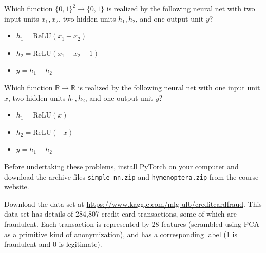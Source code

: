 \documentclass{article}
\newcommand{\R}{\mathbb{R}}
\begin{document}
\begin{probset}
\begin{prob}
    \begin{subprobset}
    \begin{subprob}
        Which function $\{0, 1\}^2 \rightarrow \{0, 1\}$ is realized by the following neural net with two input units $x_1, x_2$, two hidden units $h_1, h_2$, and one output unit $y$?
        \begin{itemize}
            \item $h_1 = \text{ReLU}(x_1 + x_2)$
            \item $h_2 = \text{ReLU}(x_1 + x_2 - 1)$
            \item $y = h_1 - h_2$
        \end{itemize}

        \begin{soln}

        \end{soln}
    \end{subprob}

    \begin{subprob}
        Which function $\R \rightarrow \R$ is realized by the following neural net with one input unit $x$, two hidden units $h_1, h_2$, and one output unit $y$?
        \begin{itemize}
            \item $h_1 = \text{ReLU}(x)$
            \item $h_2 = \text{ReLU}(-x)$
            \item $y = h_1 + h_2$
        \end{itemize}

        \begin{soln}

        \end{soln}
    \end{subprob}
    \end{subprobset}
\end{prob}

{}

Before undertaking these problems, install PyTorch on your computer and download the archive files \texttt{simple-nn.zip} and \texttt{hymenoptera.zip} from the course website.

\begin{progprob}
    Download the data set at \url{https://www.kaggle.com/mlg-ulb/creditcardfraud}. This data set has details of 284,807 credit card transactions, some of which are fraudulent. Each transaction is represented by 28 features (scrambled using PCA as a primitive kind of anonymization), and has a corresponding label (1 is fraudulent and 0 is legitimate).


\end{progprob}
\end{probset}
\end{document}
